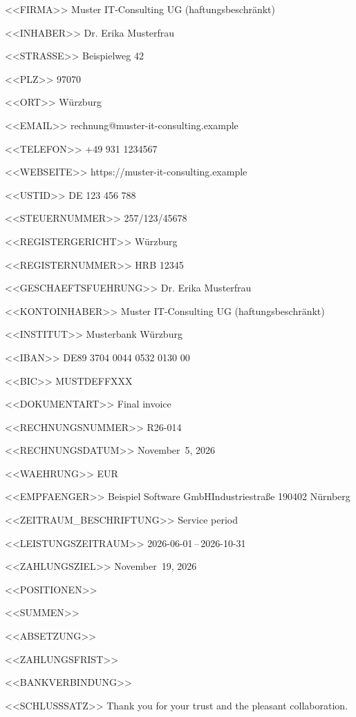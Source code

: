 <<FIRMA>>
Muster IT-Consulting UG (haftungsbeschränkt)

<<INHABER>>
Dr. Erika Musterfrau

<<STRASSE>>
Beispielweg 42

<<PLZ>>
97070

<<ORT>>
Würzburg

<<EMAIL>>
rechnung@muster-it-consulting.example

<<TELEFON>>
+49 931 1234567

<<WEBSEITE>>
https://muster-it-consulting.example

<<USTID>>
DE 123 456 788

<<STEUERNUMMER>>
257/123/45678

<<REGISTERGERICHT>>
Würzburg

<<REGISTERNUMMER>>
HRB 12345

<<GESCHAEFTSFUEHRUNG>>
Dr. Erika Musterfrau

<<KONTOINHABER>>
Muster IT-Consulting UG (haftungsbeschränkt)

<<INSTITUT>>
Musterbank Würzburg

<<IBAN>>
DE89 3704 0044 0532 0130 00

<<BIC>>
MUSTDEFFXXX

<<DOKUMENTART>>
Final invoice

<<RECHNUNGSNUMMER>>
R26-014

<<RECHNUNGSDATUM>>
November~5, 2026

<<WAEHRUNG>>
EUR

<<EMPFAENGER>>
Beispiel Software GmbH\zeilenwechsel{}Industriestraße 1\zeilenwechsel{}90402 Nürnberg

<<ZEITRAUM_BESCHRIFTUNG>>
Service period

<<LEISTUNGSZEITRAUM>>
2026-06-01\,–\,2026-10-31

<<ZAHLUNGSZIEL>>
November~19, 2026

<<POSITIONEN>>

<<SUMMEN>>
   \summentrenner{}

<<ABSETZUNG>>

<<ZAHLUNGSFRIST>>

<<BANKVERBINDUNG>>
\bankblock{}

<<SCHLUSSSATZ>>
Thank you for your trust and the pleasant collaboration.
